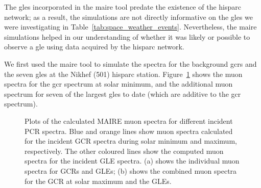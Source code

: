 The \glspl{gle} incorporated in the \gls{maire} tool predate the existence of the \gls{hisparc} network; as a result, the simulations are not directly informative on the \glspl{gle} we were investigating in Table~\ref{tab:space_weather_events}. Nevertheless, the \gls{maire} simulations helped in our understanding of whether it was likely or possible to observe a \gls{gle} using data acquired by the \gls{hisparc} network.


We first used the \gls{maire} tool to simulate the spectra for the background \glspl{gcr} and the seven \glspl{gle} at the Nikhef (501) \gls{hisparc} station. Figure~\ref{fig:MAIRE_muon_spectra} shows the muon spectra for the \gls{gcr} spectrum at solar minimum, and the additional muon spectrum for seven of the largest \glspl{gle} to date (which are additive to the \gls{gcr} spectrum).


\begin{figure}[ht!]
	\centering
	\qquad
	\caption{Plots of the calculated MAIRE muon spectra for different incident PCR spectra. Blue and orange lines show muon spectra calculated for the incident GCR spectra during solar minimum and maximum, respectively. The other coloured lines show the computed muon spectra for the incident GLE spectra. (a) shows the individual muon spectra for GCRs and GLEs; (b) shows the combined muon spectra for the GCR at solar maximum and the GLEs.}
	\label{fig:MAIRE_muon_spectra}
\end{figure}


